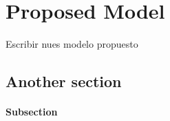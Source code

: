 \chapter{Proposed Model}

Escribir nues modelo propuesto
 

\section{Another section}



\subsubsection{Subsection}

